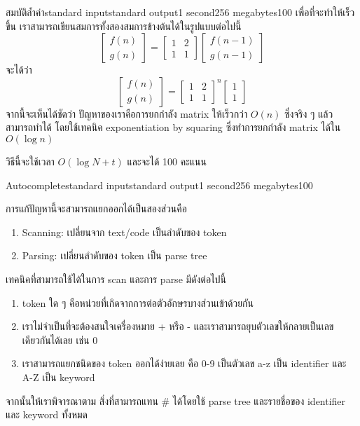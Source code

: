 \documentclass[11pt,a4paper]{article}
\begin{document}
\begin{problem}{สมบัติล้ำค่า}{standard input}{standard output}{1 second}{256 megabytes}{100}
เพื่อที่จะทำให้เร็วขึ้น เราสามารถเขียนสมการทั้งสองสมการข้างต้นได้ในรูปแบบต่อไปนี้
\[
\begin{bmatrix}
f(n)\\
g(n)
\end{bmatrix}
=
\begin{bmatrix}
1 & 2\\
1 & 1
\end{bmatrix}
\begin{bmatrix}
f(n-1)\\
g(n-1)
\end{bmatrix}
\]
จะได้ว่า 
\[
\begin{bmatrix}
f(n)\\
g(n)
\end{bmatrix}
=
\begin{bmatrix}
1 & 2\\
1 & 1
\end{bmatrix}^n
\begin{bmatrix}
1\\
1
\end{bmatrix}
\]
จากนี้จะเห็นได้ชัดว่า ปัญหาของเราคือการยกกำลัง matrix ให้เร็วกว่า $O(n)$ ซึ่งจริง ๆ แล้วสามารถทำได้ โดยใช้เทคนิค exponentiation by squaring ซึ่งทำการยกกำลัง matrix ได้ใน $O(\log n)$

วิธีนี้จะใช้เวลา $O(\log N + t)$ และจะได้ 100 คะแนน
\end{problem}

\pagebreak

\begin{problem}{Autocomplete}{standard input}{standard output}{1 second}{256 megabytes}{100}

การแก้ปัญหานี้จะสามารถแยกออกได้เป็นสองส่วนคือ
\begin{enumerate}
\item Scanning: เปลี่ยนจาก text/code เป็นลำดับของ token
\item Parsing: เปลี่ยนลำดับของ token เป็น parse tree
\end{enumerate}

เทคนิคที่สามารถใช้ได้ในการ scan และการ parse มีดังต่อไปนี้

\begin{enumerate}
\item token ใด ๆ คือหน่วยที่เกิดจากการต่อตัวอักษรบางส่วนเข้าด้วยกัน
\item เราไม่จำเป็นที่จะต้องสนใจเครื่องหมาย + หรือ - และเราสามารถยุบตัวเลขให้กลายเป็นเลขเดียวกันได้เลย เช่น 0
\item เราสามารถแยกชนิดของ token ออกได้ง่ายเลย คือ 0-9 เป็นตัวเลข a-z เป็น identifier และ A-Z เป็น keyword
\end{enumerate}

จากนั้นให้เราพิจารณาตาม สิ่งที่สามารถแทน # ได้โดยใช้ parse tree และรายชื่อของ identifier และ keyword ทั้งหมด
\end{problem}
\end{document}
